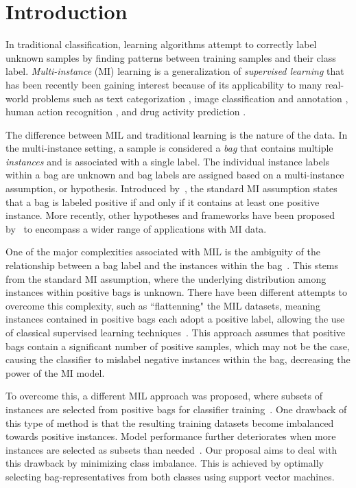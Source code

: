 \documentclass[preprint,12pt]{elsarticle}
\begin{document}
\section{Introduction}\label{intro}
In traditional classification, learning algorithms attempt to correctly label unknown samples by finding patterns between training samples and their class label. \textit{Multi-instance} (MI) learning is a generalization of \textit{supervised learning} that has been recently been gaining interest because of its applicability to many real-world problems such as text categorization \citep{Andrews2002}, image classification and annotation \citep{Herman2008,qi2007}, human action recognition \citep{Yi2016}, and drug activity prediction \citep{Dietterich1997}. 

The difference between MIL and traditional learning is the nature of the data. In the multi-instance setting, a sample is considered a \textit{bag} that contains multiple \textit{instances} and is associated with a single label. The individual instance labels within a bag are unknown and bag labels are assigned based on a multi-instance assumption, or hypothesis. Introduced by~\citet{Dietterich1997}, the standard MI assumption states that a bag is labeled positive if and only if it contains at least one positive instance. More recently, other hypotheses and frameworks have been proposed by~\citet{Foulds2010} to encompass a wider range of applications with MI data. 

One of the major complexities associated with MIL is the ambiguity of the relationship between a bag label and the instances within the bag~\citep{Alpaydin2015}. This stems from the standard MI assumption, where the underlying distribution among instances within positive bags is unknown. There have been different attempts to overcome this complexity, such as ``flattenning" the MIL datasets, meaning instances contained in positive bags each adopt a positive label, allowing the use of classical supervised learning techniques~\citep{Ray2005}. This approach assumes that positive bags contain a significant number of positive samples, which may not be the case, causing the classifier to mislabel negative instances within the bag, decreasing the power of the MI model. 

To overcome this, a different MIL approach was proposed, where subsets of instances are selected from positive bags for classifier training~\citep{Maron1998,Zhang2001}. One drawback of this type of method is that the resulting training datasets become imbalanced towards positive instances. Model performance further deteriorates when more instances are selected as subsets than needed~\citep{Carbonneau2016,Faria2017196,Vanwinckelen2016}. Our proposal aims to deal with this drawback by minimizing class imbalance. This is achieved by optimally selecting bag-representatives from both classes using support vector machines.
\end{document}
